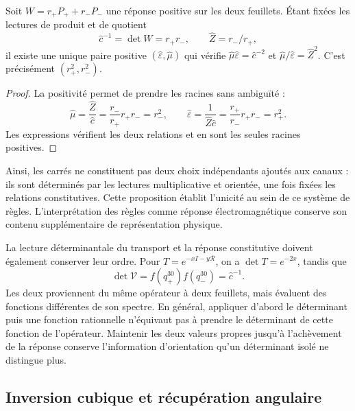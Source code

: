 \begin{proposition}
Soit $W=r_+P_++r_-P_-$ une réponse positive sur les deux feuillets.
Étant fixées les lectures de produit et de quotient
\[
 \widehat c^{-1}=\det W=r_+r_-,
 \qquad \widehat Z=r_-/r_+,
\]
il existe une unique paire positive $(\widehat\varepsilon,\widehat\mu)$
qui vérifie
$\widehat\mu\widehat\varepsilon=\widehat c^{-2}$ et
$\widehat\mu/\widehat\varepsilon=\widehat Z^2$.
C’est précisément $(r_+^2,r_-^2)$.
\end{proposition}
\begin{proof}
La positivité permet de prendre les racines sans ambiguïté :
\[
 \widehat\mu=\frac{\widehat Z}{\widehat c}
 =\frac{r_-}{r_+}r_+r_-=r_-^2,\qquad
 \widehat\varepsilon=\frac1{\widehat Z\widehat c}
 =\frac{r_+}{r_-}r_+r_-=r_+^2.
\]
Les expressions vérifient les deux relations et en sont les seules racines
positives.
\end{proof}

Ainsi, les carrés ne constituent pas deux choix indépendants ajoutés
aux canaux : ils sont déterminés par les lectures multiplicative et
orientée, une fois fixées les relations constitutives. Cette proposition
établit l’unicité au sein de ce système de règles. L’interprétation
des règles comme réponse électromagnétique conserve son contenu
supplémentaire de représentation physique.

La lecture déterminantale du transport et la réponse constitutive
doivent également conserver leur ordre. Pour $T=e^{-xI-y\mathcal R}$, on a
$\det T=e^{-2x}$, tandis que
\[
 \det\mathcal V=f(q_+^{30})f(q_-^{30})=\widehat c^{-1}.
\]
Les deux proviennent du même opérateur à deux feuillets, mais évaluent des fonctions différentes de son spectre. En général, appliquer d'abord le déterminant puis une fonction rationnelle n'équivaut pas à prendre le déterminant de cette fonction de l'opérateur. Maintenir les deux valeurs propres jusqu'à l'achèvement de la réponse conserve l'information d'orientation qu'un déterminant isolé ne distingue plus.

\subsection{Inversion cubique et récupération angulaire}

